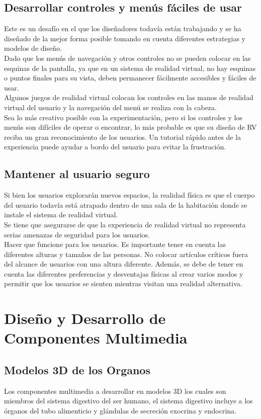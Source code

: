 \subsection{Desarrollar controles y menús fáciles de usar}
Este es un desafío en el que los diseñadores todavía están trabajando y se ha diseñado de la mejor forma posible tomando en cuenta diferentes estrategias y modelos de diseño.\\
Dado que los menús de navegación y otros controles no se pueden colocar en las esquinas de la pantalla, ya que en un sistema de realidad virtual, no hay esquinas o puntos finales 
para su vista, deben permanecer fácilmente accesibles y fáciles de usar.\\
Algunos juegos de realidad virtual colocan los controles en las manos de realidad virtual del usuario y la navegación del menú se realiza con la cabeza.\\
Sea lo más creativo posible con la experimentación, pero si los controles y los menús son difíciles de operar o encontrar, lo más probable es que su diseño de RV reciba un gran 
reconocimiento de los usuarios. Un tutorial rápido antes de la experiencia puede ayudar a bordo del usuario para evitar la frustración.

\subsection{Mantener al usuario seguro}
Si bien los usuarios explorarán nuevos espacios, la realidad física es que el cuerpo del usuario todavía está atrapado dentro de una sala de la habitación donde se instale el sistema 
de realidad virtual.\\
Se tiene que asegurarse de que la experiencia de realidad virtual no representa serias amenazas de seguridad para los usuarios.\\
Hacer que funcione para los usuarios. Es importante tener en cuenta las diferentes alturas y tamaños de las personas. No colocar artículos críticos fuera del alcance de usuarios con 
una altura diferente. Además, se debe de tener en cuenta las diferentes preferencias y desventajas físicas al crear varios modos y permitir que los usuarios se sienten mientras visitan 
una realidad alternativa.

\section{Diseño y Desarrollo de Componentes Multimedia}

\subsection{Modelos 3D de los Organos}
Los componentes multimedia a desarrollar en modelos 3D los cuales son miembros del sistema digestivo del ser humano, 
el sistema digestivo incluye a los órganos del tubo alimenticio y glándulas de secreción exocrina y endocrina.\\

